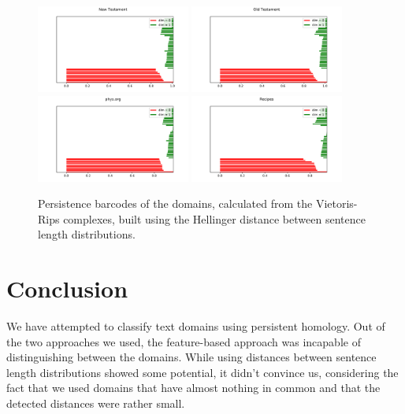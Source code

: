 \documentclass[12pt,a4paper]{amsart}
\begin{document}
\begin{figure}
  \centering
  \includegraphics[width=0.45\textwidth]{../plots/barcodes/bible-new-hell}
  \includegraphics[width=0.45\textwidth]{../plots/barcodes/bible-old-hell}
  \includegraphics[width=0.45\textwidth]{../plots/barcodes/phys-hell}
  \includegraphics[width=0.45\textwidth]{../plots/barcodes/recipes-hell}
  \caption{Persistence barcodes of the domains, calculated from the
    Vietoris-Rips complexes, built using the Hellinger distance between sentence
    length distributions.}
  \label{fig:barcode:hell}
\end{figure}

\section{Conclusion}

We have attempted to classify text domains using persistent homology. Out of the
two approaches we used, the feature-based approach was incapable of
distinguishing between the domains. While using distances between sentence
length distributions showed some potential, it didn't convince us, considering
the fact that we used domains that have almost nothing in common and that the
detected distances were rather small.
\end{document}
